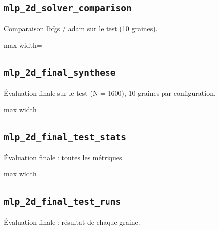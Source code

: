 \documentclass[a4paper,10pt]{article}
\newcommand{\tablesroot}{results/tables}
\begin{document}
\noindent\begin{minipage}{\linewidth}
\subsection*{\texttt{mlp\_2d\_solver\_comparison}}
Comparaison lbfgs / adam sur le test (10 graines).
\par
\begingroup\centering\footnotesize
\begin{adjustbox}{max width=\linewidth}

\end{adjustbox}\par
\endgroup
\end{minipage}
\par\medskip

\noindent\begin{minipage}{\linewidth}
\subsection*{\texttt{mlp\_2d\_final\_synthese}}
\'Evaluation finale sur le test (N = 1600), 10 graines par configuration.
\par
\begingroup\centering\footnotesize
\begin{adjustbox}{max width=\linewidth}

\end{adjustbox}\par
\endgroup
\end{minipage}
\par\medskip

\noindent\begin{minipage}{\linewidth}
\subsection*{\texttt{mlp\_2d\_final\_test\_stats}}
\'Evaluation finale : toutes les m\'etriques.
\par
\begingroup\centering\footnotesize
\begin{adjustbox}{max width=\linewidth}

\end{adjustbox}\par
\endgroup
\end{minipage}
\par\medskip

\noindent\begin{minipage}{\linewidth}
\subsection*{\texttt{mlp\_2d\_final\_test\_runs}}
\'Evaluation finale : r\'esultat de chaque graine.
\par
\end{minipage}\par
\addtocounter{table}{-1}
\begingroup\footnotesize

\endgroup
\par\medskip
\end{document}
